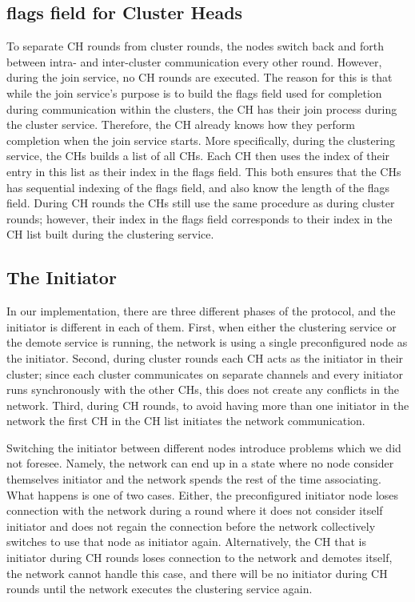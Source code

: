 \subsection{flags field for Cluster Heads}
To separate CH rounds from cluster rounds, the nodes switch back and forth between intra- and inter-cluster communication every other round. However, during the join service, no CH rounds are executed. The reason for this is that while the join service's purpose is to build the flags field used for completion during communication within the clusters, the CH has their join process during the cluster service. Therefore, the CH already knows how they perform completion when the join service starts. More specifically, during the clustering service, the CHs builds a list of all CHs. Each CH then uses the index of their entry in this list as their index in the flags field. This both ensures that the CHs has sequential indexing of the flags field, and also know the length of the flags field. During CH rounds the CHs still use the same procedure as during cluster rounds; however, their index in the flags field corresponds to their index in the CH list built during the clustering service.

\subsection{The Initiator}
\label{subsec:implementation_the-initiator}
In our implementation, there are three different phases of the protocol, and the initiator is different in each of them. First, when either the clustering service or the demote service is running, the network is using a single preconfigured node as the initiator. Second, during cluster rounds each CH acts as the initiator in their cluster; since each cluster communicates on separate channels and every initiator runs synchronously with the other CHs, this does not create any conflicts in the network. Third, during CH rounds, to avoid having more than one initiator in the network the first CH in the CH list initiates the network communication.

Switching the initiator between different nodes introduce problems which we did not foresee. Namely, the network can end up in a state where no node consider themselves initiator and the network spends the rest of the time associating. What happens is one of two cases. Either, the preconfigured initiator node loses connection with the network during a round where it does not consider itself initiator and does not regain the connection before the network collectively switches to use that node as initiator again. Alternatively, the CH that is initiator during CH rounds loses connection to the network and demotes itself, the network cannot handle this case, and there will be no initiator during CH rounds until the network executes the clustering service again. 

